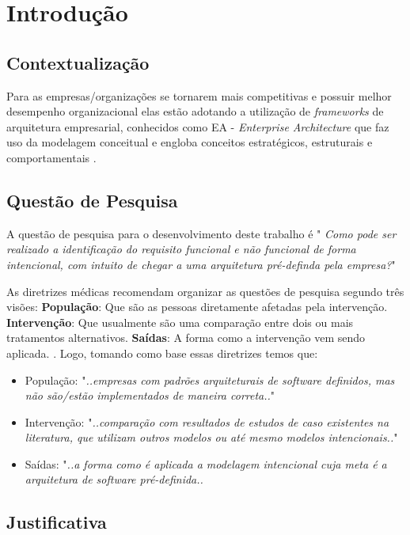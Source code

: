 \chapter{Introdução}

\section{Contextualização}

Para as empresas/organizações se tornarem mais competitivas e possuir melhor desempenho organizacional elas estão adotando a utilização de \textit{frameworks} de arquitetura empresarial, conhecidos como EA - {\textit{Enterprise Architecture}} que faz uso da modelagem conceitual e engloba conceitos estratégicos, estruturais e comportamentais \cite{yu2006exploring}.


\section{Questão de Pesquisa}
A questão de pesquisa para o desenvolvimento deste trabalho é " \textit{Como pode ser realizado a identificação do requisito funcional e não funcional de forma intencional, com intuito de chegar a uma arquitetura pré-definda pela empresa?}"

As diretrizes médicas recomendam organizar as questões de pesquisa segundo três visões: \textbf{População}: Que são as pessoas diretamente afetadas pela intervenção. \textbf{Intervenção}: Que usualmente são uma comparação entre dois ou mais tratamentos alternativos. \textbf{Saídas}: A forma como a intervenção vem sendo aplicada. \cite{keele2007guidelines}. Logo, tomando como base essas diretrizes temos que: 

\begin{itemize}
	\item População: "\textit{..empresas com padrões arquiteturais de software definidos, mas não são/estão implementados de maneira correta..}"
	\item Intervenção: "\textit{..comparação com resultados de estudos de caso existentes na literatura, que utilizam outros modelos ou até mesmo modelos intencionais..}"
	\item Saídas: "\textit{..a forma como é aplicada a modelagem intencional cuja meta é a arquitetura de software pré-definida..}
\end{itemize}
\section{Justificativa}

